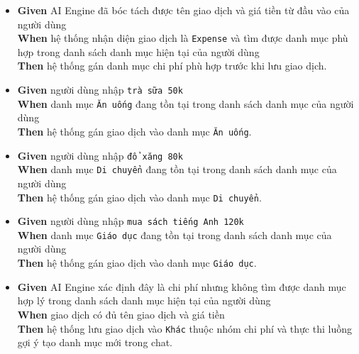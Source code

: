 \begin{itemize}
\item \textbf{Given} AI Engine đã bóc tách được tên giao dịch và giá tiền từ đầu vào của người dùng  \\ \hspace*{1.5em}  \textbf{When} hệ thống nhận diện giao dịch là \texttt{Expense} và tìm được danh mục phù hợp trong danh sách danh mục hiện tại của người dùng  \\ \hspace*{1.5em}  \textbf{Then} hệ thống gán danh mục chi phí phù hợp trước khi lưu giao dịch.
\item \textbf{Given} người dùng nhập \texttt{trà sữa 50k}  \\ \hspace*{1.5em}  \textbf{When} danh mục \texttt{Ăn uống} đang tồn tại trong danh sách danh mục của người dùng  \\ \hspace*{1.5em}  \textbf{Then} hệ thống gán giao dịch vào danh mục \texttt{Ăn uống}.
\item \textbf{Given} người dùng nhập \texttt{đổ xăng 80k}  \\ \hspace*{1.5em}  \textbf{When} danh mục \texttt{Di chuyển} đang tồn tại trong danh sách danh mục của người dùng  \\ \hspace*{1.5em}  \textbf{Then} hệ thống gán giao dịch vào danh mục \texttt{Di chuyển}.
\item \textbf{Given} người dùng nhập \texttt{mua sách tiếng Anh 120k}  \\ \hspace*{1.5em}  \textbf{When} danh mục \texttt{Giáo dục} đang tồn tại trong danh sách danh mục của người dùng  \\ \hspace*{1.5em}  \textbf{Then} hệ thống gán giao dịch vào danh mục \texttt{Giáo dục}.
\item \textbf{Given} AI Engine xác định đây là chi phí nhưng không tìm được danh mục hợp lý trong danh sách danh mục hiện tại của người dùng  \\ \hspace*{1.5em}  \textbf{When} giao dịch có đủ tên giao dịch và giá tiền  \\ \hspace*{1.5em}  \textbf{Then} hệ thống lưu giao dịch vào \texttt{Khác} thuộc nhóm chi phí và thực thi luồng gợi ý tạo danh mục mới trong chat.
\end{itemize}
